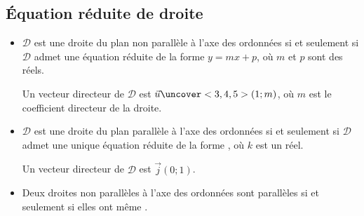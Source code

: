 \documentclass{beamer}
\begin{document}
  \subsection{\'Equation réduite de droite}

  \begin{frame}
   
     \begin{theorem}
     
     \begin{itemize}
      \item 
      $\mathcal{D}$ est une droite du plan non parallèle à l'axe des ordonnées si et seulement si
    $\mathcal{D}$ admet une  équation réduite de la forme $y=mx+p$, où $m$ et $p$ sont des réels.
    
    Un vecteur directeur de $\mathcal{D}$ est $\vec{u}\uncover<3,4,5>{(1;m)}$, où $m$ est le coefficient directeur
    de la droite.
    
    \item
    $\mathcal{D}$ est une droite du plan parallèle à l'axe des ordonnées si et seulement si
    $\mathcal{D}$ admet une unique équation réduite de la forme , où $k$ est un réel.
    
    Un vecteur directeur de $\mathcal{D}$ est $\vec{j}(0;1)$.
    
    \item Deux droites non parallèles à l'axe des ordonnées sont parallèles si et seulement si 
    elles ont même .
     \end{itemize}
     
   \end{theorem}

  \end{frame}
  
\end{document}
